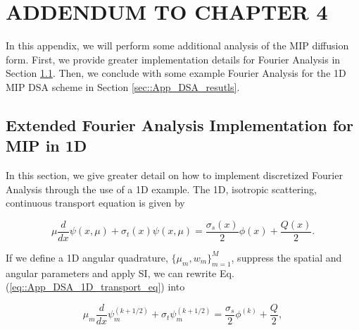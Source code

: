 %
%
%


\chapter{\uppercase {Addendum to Chapter 4}}
\label{sec::appendix_DSA}

In this appendix, we will perform some additional analysis of the MIP diffusion form. First, we provide greater implementation details for Fourier Analysis in Section \ref{sec::App_DSA_fourier}. Then, we conclude with some example Fourier Analysis for the 1D MIP DSA scheme in Section \ref{sec::App_DSA_resutls}.

\section{Extended Fourier Analysis Implementation for MIP in 1D}
\label{sec::App_DSA_fourier}

In this section, we give greater detail on how to implement discretized Fourier Analysis through the use of a 1D example. The 1D, isotropic scattering, continuous transport equation is given by

\begin{equation}
\label{eq::App_DSA_1D_transport_eq}
\mu \frac{d }{d x} \psi (x,\mu) + \sigma_t (x) \psi(x,\mu) = \frac{\sigma_s (x)}{2} \phi(x) + \frac{Q(x)}{2}.
\end{equation}

\noindent If we define a 1D angular quadrature, $\{  \mu_m, w_m \}_{m=1}^M$, suppress the spatial and angular parameters and apply SI, we can rewrite Eq. (\ref{eq::App_DSA_1D_transport_eq}) into

\begin{equation}
\label{eq::App_DSA_1D_transport_discangle}
\mu_m \frac{d }{d x} \psi_m^{(k+1/2)} + \sigma_t \psi_m^{(k+1/2)} = \frac{\sigma_s }{2} \phi^{(k)}  + \frac{Q}{2},
\end{equation}

